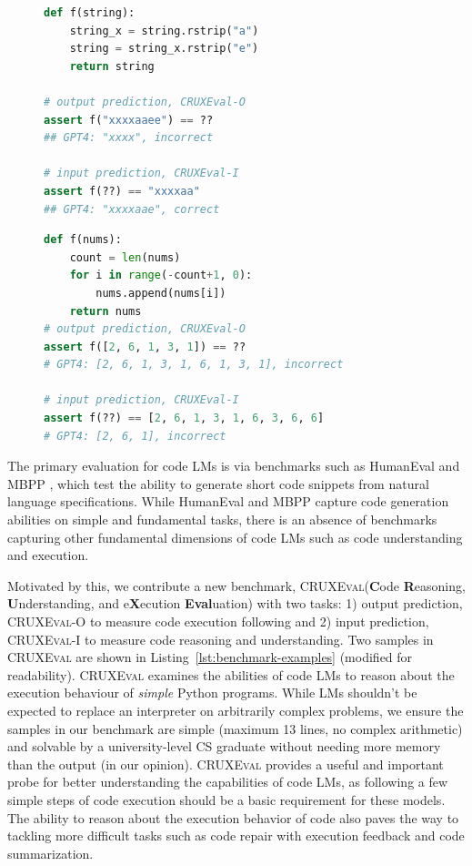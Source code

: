 \documentclass{article}
\newcommand{\benchmark}{\textsc{CRUXEval}\xspace}
\newcommand{\benchmarki}{\textsc{CRUXEval-I}\xspace}
\newcommand{\benchmarko}{\textsc{CRUXEval-O}\xspace}
\theoremstyle{plain}
\theoremstyle{definition}
\theoremstyle{remark}
\begin{document}
\begin{figure}[t!]
\vspace{-1.5em}
\begin{lstlisting}[caption={},label={lst:benchmark-example1}, captionpos=t, breaklines=true, language=Python]
def f(string):
    string_x = string.rstrip("a")
    string = string_x.rstrip("e")
    return string

# output prediction, CRUXEval-O
assert f("xxxxaaee") == ??
## GPT4: "xxxx", incorrect

# input prediction, CRUXEval-I
assert f(??) == "xxxxaa"
## GPT4: "xxxxaae", correct
\end{lstlisting}
\vspace{-1em}
\begin{lstlisting}[caption={Sample problems},label={lst:benchmark-examples}, captionpos=b, breaklines=true, language=python]
def f(nums):
    count = len(nums)
    for i in range(-count+1, 0):
        nums.append(nums[i])
    return nums
# output prediction, CRUXEval-O
assert f([2, 6, 1, 3, 1]) == ??
# GPT4: [2, 6, 1, 3, 1, 6, 1, 3, 1], incorrect

# input prediction, CRUXEval-I
assert f(??) == [2, 6, 1, 3, 1, 6, 3, 6, 6]
# GPT4: [2, 6, 1], incorrect
\end{lstlisting}
\vspace{-.75em}
\end{figure}

The primary evaluation for code LMs is via benchmarks such as HumanEval \citep{chen2021evaluating} and MBPP \citep{austin2021program}, which test the ability to generate short code snippets from natural language specifications. While HumanEval and MBPP capture code generation abilities on simple and fundamental tasks, there is an absence of benchmarks capturing other fundamental dimensions of code LMs such as code understanding and execution.

Motivated by this, we contribute a new benchmark, \benchmark (\textbf{C}ode \textbf{R}easoning, \textbf{U}nderstanding, and e\textbf{X}ecution \textbf{Eval}uation) with two tasks: 1) output prediction, \benchmarko to measure code execution following and 2) input prediction, \benchmarki to measure code reasoning and understanding. Two samples in \benchmark are shown in Listing~\ref{lst:benchmark-examples} (modified for readability). \benchmark examines the abilities of code LMs to reason about the execution behaviour of \textit{simple} Python programs. While LMs shouldn't be expected to replace an interpreter on arbitrarily complex problems, we ensure the samples in our benchmark are simple (maximum 13 lines, no complex arithmetic) and solvable by a university-level CS graduate without needing more memory than the output (in our opinion). \benchmark provides a useful and important probe for better understanding the capabilities of code LMs, as following a few simple steps of code execution should be a basic requirement for these models. The ability to reason about the execution behavior of code also paves the way to tackling more difficult tasks such as code repair with execution feedback and code summarization.
\end{document}
